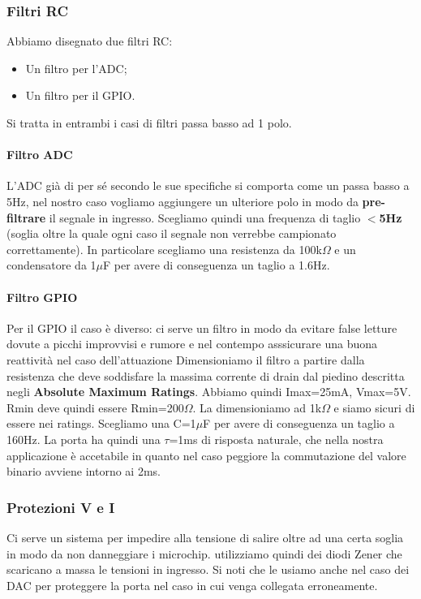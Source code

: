 \documentclass[10pt]{article}
\begin{document}
		\subsubsection{Filtri RC}
		Abbiamo disegnato due filtri RC:
		\begin{itemize}
		        \item Un filtro per l'ADC;
		        \item Un filtro per il GPIO.
		\end{itemize}

		Si tratta in entrambi i casi di filtri passa basso ad 1 polo.

			\paragraph{Filtro ADC}
				L'ADC già di per sé secondo le sue specifiche si comporta come un passa basso a 5Hz, nel nostro caso vogliamo aggiungere un ulteriore polo in modo da \textbf{pre-filtrare} il segnale in ingresso.
				Scegliamo quindi una frequenza di taglio \textbf{\(<\)5Hz} (soglia oltre la quale ogni caso il segnale non verrebbe campionato correttamente).
				In particolare scegliamo una resistenza da 100k\(\Omega\) e un condensatore da 1\(\mu\)F per avere di conseguenza un taglio a 1.6Hz.
			\paragraph{Filtro GPIO}
				Per il GPIO il caso è diverso: ci serve un filtro in modo da evitare false letture dovute a picchi improvvisi e rumore e nel contempo asssicurare una buona reattività nel caso dell'attuazione
				Dimensioniamo il filtro a partire dalla resistenza che deve soddisfare la massima corrente di drain dal piedino descritta negli \textbf{Absolute Maximum Ratings}.
				Abbiamo quindi Imax=25mA, Vmax=5V. Rmin deve quindi essere Rmin=200\(\Omega\). La dimensioniamo ad 1k\(\Omega\) e siamo sicuri di essere nei ratings.
				Scegliamo una C=1\(\mu\)F per avere di conseguenza un taglio a 160Hz. La porta ha quindi una \(\tau\)=1ms di risposta naturale, che nella nostra applicazione è accetabile in quanto nel caso peggiore la commutazione del valore binario avviene intorno ai 2ms.
		\subsubsection{Protezioni V e I}
		Ci serve un sistema per impedire alla tensione di salire oltre ad una certa soglia in modo da non danneggiare i microchip. utilizziamo quindi dei diodi Zener che scaricano a massa le tensioni in ingresso.
		Si noti che le usiamo anche nel caso dei DAC per proteggere la porta nel caso in cui venga collegata erroneamente.
\end{document}
